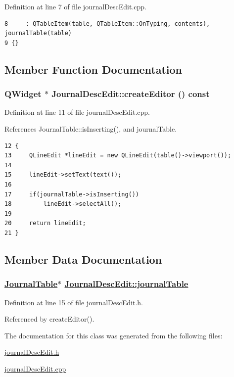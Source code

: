 Definition at line 7 of file journal\-Desc\-Edit.cpp.

\footnotesize\begin{verbatim}8     : QTableItem(table, QTableItem::OnTyping, contents), journalTable(table)
9 {}
\end{verbatim}\normalsize 




\subsection{Member Function Documentation}
\hypertarget{classJournalDescEdit_a1}{
\subsubsection[createEditor]{\setlength{\rightskip}{0pt plus 5cm}QWidget $\ast$ Journal\-Desc\-Edit::create\-Editor () const}}
\label{classJournalDescEdit_a1}


Definition at line 11 of file journal\-Desc\-Edit.cpp.

References Journal\-Table::is\-Inserting(), and journal\-Table.

\footnotesize\begin{verbatim}12 {
13     QLineEdit *lineEdit = new QLineEdit(table()->viewport());
14     
15     lineEdit->setText(text());
16     
17     if(journalTable->isInserting())
18         lineEdit->selectAll();
19 
20     return lineEdit;
21 }
\end{verbatim}\normalsize 




\subsection{Member Data Documentation}
\hypertarget{classJournalDescEdit_r0}{
\subsubsection[journalTable]{\setlength{\rightskip}{0pt plus 5cm}\hyperlink{classJournalTable}{Journal\-Table}$\ast$ \hyperlink{classJournalDescEdit_r0}{Journal\-Desc\-Edit::journal\-Table}}}
\label{classJournalDescEdit_r0}


Definition at line 15 of file journal\-Desc\-Edit.h.

Referenced by create\-Editor().

The documentation for this class was generated from the following files:\begin{CompactItemize}
\item 
\hyperlink{journalDescEdit_8h}{journal\-Desc\-Edit.h}\item 
\hyperlink{journalDescEdit_8cpp}{journal\-Desc\-Edit.cpp}\end{CompactItemize}
